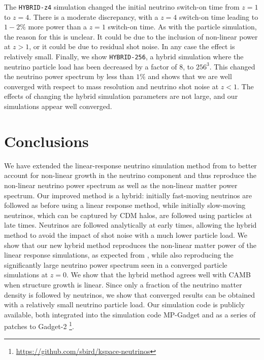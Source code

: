 \documentclass[useAMS, usenatbib]{mnras}
\begin{document}
The \texttt{HYBRID-z4} simulation changed the initial neutrino switch-on time from $z=1$ to $z=4$. There is a moderate discrepancy, with a $z=4$ switch-on time leading to $1-2\%$ more power than a $z=1$ switch-on time. As with the particle simulation, the reason for this is unclear. It could be due to the inclusion of non-linear power at $z>1$, or it could be due to residual shot noise. In any case the effect is relatively small. Finally, we show \texttt{HYBRID-256}, a hybrid simulation where the neutrino particle load has been decreased by a factor of $8$, to $256^3$. This changed the neutrino power spectrum by less than $1\%$ and shows that we are well converged with respect to mass resolution and neutrino shot noise at $z < 1$.
The effects of changing the hybrid simulation parameters are not large, and our simulations appear well converged.

\section{Conclusions}
\label{sec:conclusion}

We have extended the linear-response neutrino simulation method from \cite{AHB} to better account for non-linear growth in the neutrino component and thus reproduce the non-linear neutrino power spectrum as well as the non-linear matter power spectrum.
Our improved method is a hybrid: initially fast-moving neutrinos are followed as before using a linear response method, while initially slow-moving neutrinos, which can be captured by CDM halos, are followed using particles at late times. Neutrinos are followed analytically at early times, allowing the hybrid method to avoid the impact of shot noise with a much lower particle load. We show that our new hybrid method reproduces the non-linear matter power of the linear response simulations, as expected from \cite{AHB}, while also reproducing the significantly large neutrino power spectrum seen in a converged particle simulations at $z=0$. We show that the hybrid method agrees well with CAMB when structure growth is linear. Since only a fraction of the neutrino matter density is followed by neutrinos, we show that converged results can be obtained with a relatively small neutrino particle load. Our simulation code is publicly available, both integrated into the simulation code MP-Gadget and as a series of patches to Gadget-2 \footnote{\url{https://github.com/sbird/kspace-neutrinos}}.

\end{document}

